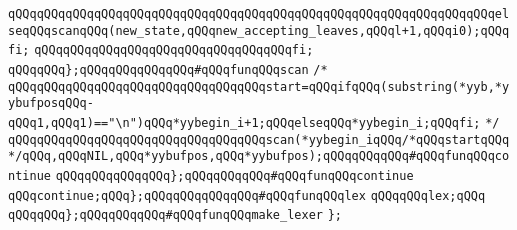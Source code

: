 \verb|qQQqqQQqqQQqqQQqqQQqqQQqqQQqqQQqqQQqqQQqqQQqqQQqqQQqqQQqqQQqqQQqqQQqelseqQQqscanqQQq(new_state,qQQqnew_accepting_leaves,qQQql+1,qQQqi0);qQQqfi;|\newline
\verb|qQQqqQQqqQQqqQQqqQQqqQQqqQQqqQQqqQQqfi;|\newline
\verb|qQQqqQQq};qQQqqQQqqQQqqQQq#qQQqfunqQQqscan|\newline
\verb|/*|\newline
\verb|qQQqqQQqqQQqqQQqqQQqqQQqqQQqqQQqqQQqstart=qQQqifqQQq(substring(*yyb,*yybufposqQQq-qQQq1,qQQq1)=="\n")qQQq*yybegin_i+1;qQQqelseqQQq*yybegin_i;qQQqfi;|\newline
\verb|*/|\newline
\verb|qQQqqQQqqQQqqQQqqQQqqQQqqQQqqQQqqQQqscan(*yybegin_iqQQq/*qQQqstartqQQq*/qQQq,qQQqNIL,qQQq*yybufpos,qQQq*yybufpos);qQQqqQQqqQQq#qQQqfunqQQqcontinue|\newline
\verb|qQQqqQQqqQQqqQQq};qQQqqQQqqQQq#qQQqfunqQQqcontinue|\newline
\verb|qQQqcontinue;qQQq};qQQqqQQqqQQqqQQq#qQQqfunqQQqlex|\newline
\verb|qQQqqQQqlex;qQQq|\newline
\verb|qQQqqQQq};qQQqqQQqqQQq#qQQqfunqQQqmake_lexer|\newline
\verb|};|\newline

